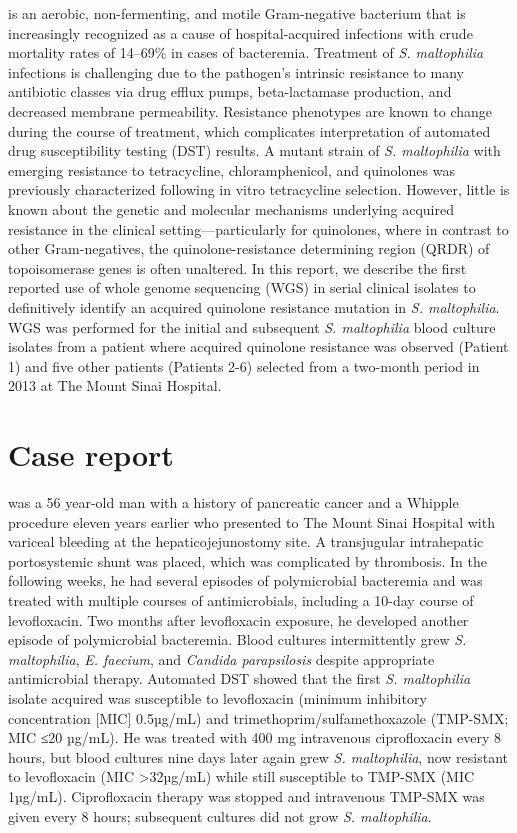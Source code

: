  is an aerobic, non-fermenting, and motile Gram-negative bacterium that is increasingly recognized as a cause of hospital-acquired infections with crude mortality rates of 14–69\% in cases of bacteremia.\autocite{Brooke2012} Treatment of \emph{S. maltophilia} infections is challenging due to the pathogen’s intrinsic resistance to many antibiotic classes via drug efflux pumps, beta-lactamase production, and decreased membrane permeability.\autocite{Brooke2012} Resistance phenotypes are known to change during the course of treatment, which complicates interpretation of automated drug susceptibility testing (DST) results.\autocite{Garrison1996} A mutant strain of \emph{S. maltophilia} with emerging resistance to tetracycline, chloramphenicol, and quinolones was previously characterized following in vitro tetracycline selection.\autocite{Alonso1997,Sanchez2002} However, little is known about the genetic and molecular mechanisms underlying acquired resistance in the clinical setting—particularly for quinolones, where in contrast to other Gram-negatives, the quinolone-resistance determining region (QRDR) of topoisomerase genes is often unaltered.\autocite{Valdezate2005} In this report, we describe the first reported use of whole genome sequencing (WGS) in serial clinical isolates to definitively identify an acquired quinolone resistance mutation in \emph{S. maltophilia}. WGS was performed for the initial and subsequent \emph{S. maltophilia} blood culture isolates from a patient where acquired quinolone resistance was observed (Patient 1) and five other patients (Patients 2-6) selected from a two-month period in 2013 at The Mount Sinai Hospital. 

\section{Case report}

 was a 56 year-old man with a history of pancreatic cancer and a Whipple procedure eleven years earlier who presented to The Mount Sinai Hospital with variceal bleeding at the hepaticojejunostomy site. A transjugular intrahepatic portosystemic shunt was placed, which was complicated by thrombosis. In the following weeks, he had several episodes of polymicrobial bacteremia and was treated with multiple courses of antimicrobials, including a 10-day course of levofloxacin. Two months after levofloxacin exposure, he developed another episode of polymicrobial bacteremia. Blood cultures intermittently grew \emph{S. maltophilia}, \emph{E. faecium}, and \emph{Candida parapsilosis} despite appropriate antimicrobial therapy. Automated DST showed that the first \emph{S. maltophilia} isolate acquired was susceptible to levofloxacin (minimum inhibitory concentration [MIC] 0.5µg/mL) and trimethoprim/sulfamethoxazole (TMP-SMX; MIC ≤20 µg/mL). He was treated with 400 mg intravenous ciprofloxacin every 8 hours, but blood cultures nine days later again grew \emph{S. maltophilia}, now resistant to levofloxacin (MIC >32µg/mL) while still susceptible to TMP-SMX (MIC 1µg/mL). Ciprofloxacin therapy was stopped and intravenous TMP-SMX was given every 8 hours; subsequent cultures did not grow \emph{S. maltophilia}.

